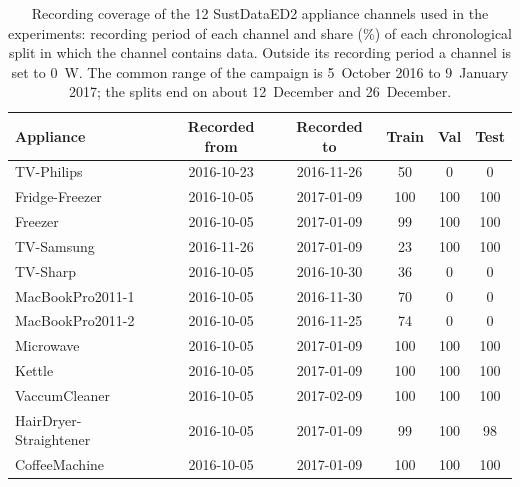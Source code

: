 \begin{table}[H]
\centering
\caption{Recording coverage of the 12 SustDataED2 appliance channels used in the experiments: recording period of each channel and share (\%) of each chronological split in which the channel contains data. Outside its recording period a channel is set to 0~W. The common range of the campaign is 5~October 2016 to 9~January 2017; the splits end on about 12~December and 26~December.}
\label{tab:sust_coverage}
\footnotesize
\begin{tabular}{@{}lccccc@{}}
\toprule
Appliance & Recorded from & Recorded to & Train & Val & Test \\
\midrule
TV-Philips & 2016-10-23 & 2016-11-26 & 50 & 0 & 0 \\
Fridge-Freezer & 2016-10-05 & 2017-01-09 & 100 & 100 & 100 \\
Freezer & 2016-10-05 & 2017-01-09 & 99 & 100 & 100 \\
TV-Samsung & 2016-11-26 & 2017-01-09 & 23 & 100 & 100 \\
TV-Sharp & 2016-10-05 & 2016-10-30 & 36 & 0 & 0 \\
MacBookPro2011-1 & 2016-10-05 & 2016-11-30 & 70 & 0 & 0 \\
MacBookPro2011-2 & 2016-10-05 & 2016-11-25 & 74 & 0 & 0 \\
Microwave & 2016-10-05 & 2017-01-09 & 100 & 100 & 100 \\
Kettle & 2016-10-05 & 2017-01-09 & 100 & 100 & 100 \\
VaccumCleaner & 2016-10-05 & 2017-02-09 & 100 & 100 & 100 \\
HairDryer-Straightener & 2016-10-05 & 2017-01-09 & 99 & 100 & 98 \\
CoffeeMachine & 2016-10-05 & 2017-01-09 & 100 & 100 & 100 \\
\bottomrule
\end{tabular}
\end{table}

